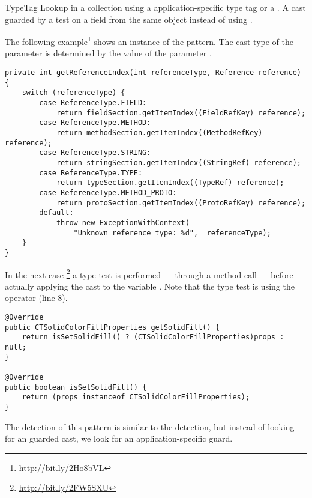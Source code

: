 \begin{pattern}{TypeTag}
Lookup in a collection using a application-specific type tag or a
.
A cast guarded by a test on a field from the same object instead of
using .

\instances{}
The following example\footnote{\url{http://bit.ly/2Ho8bVL}} shows an instance of the \thisp{} pattern.
The cast type of the parameter  is determined by the value of the parameter .

\begin{verbatim}
private int getReferenceIndex(int referenceType, Reference reference) {
    switch (referenceType) {
        case ReferenceType.FIELD:
            return fieldSection.getItemIndex((FieldRefKey) reference);
        case ReferenceType.METHOD:
            return methodSection.getItemIndex((MethodRefKey) reference);
        case ReferenceType.STRING:
            return stringSection.getItemIndex((StringRef) reference);
        case ReferenceType.TYPE:
            return typeSection.getItemIndex((TypeRef) reference);
        case ReferenceType.METHOD_PROTO:
            return protoSection.getItemIndex((ProtoRefKey) reference);
        default:
            throw new ExceptionWithContext(
                "Unknown reference type: %d",  referenceType);
    }
}
\end{verbatim}

In the next case%
\footnote{\url{http://bit.ly/2FW5SXU}}
a type test is performed --- through a method call --- before actually applying the cast to the variable .
Note that the type test is using the  operator (line 8).

\begin{verbatim}
@Override
public CTSolidColorFillProperties getSolidFill() {
    return isSetSolidFill() ? (CTSolidColorFillProperties)props : null;
}

@Override
public boolean isSetSolidFill() {
    return (props instanceof CTSolidColorFillProperties);
}
\end{verbatim}

\detection{}
The detection of this pattern is similar to the  detection, but instead of looking for an  guarded cast, we look for an application-specific guard.

\discussion{}

\related{}

\end{pattern}